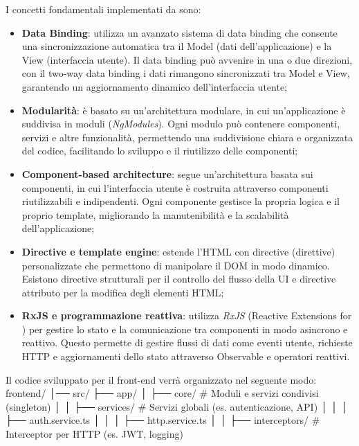 I concetti fondamentali implementati da  sono:
\begin{itemize}
    \item \textbf{Data Binding}:  utilizza un avanzato sistema di data binding che consente una sincronizzazione automatica tra il Model (dati dell'applicazione) e la View (interfaccia utente).
    Il data binding può avvenire in una o due direzioni, con il two-way data binding i dati rimangono sincronizzati tra Model e View, garantendo un aggiornamento dinamico dell'interfaccia utente;
    \item \textbf{Modularità}:   è basato su un'architettura modulare, in cui un'applicazione è suddivisa in moduli (\textit{NgModules}).
    Ogni modulo può contenere componenti, servizi e altre funzionalità, permettendo una suddivisione chiara e organizzata del codice, facilitando lo sviluppo e il riutilizzo delle componenti;
    \item \textbf{Component-based architecture}:   segue un'architettura basata sui componenti, in cui l'interfaccia utente è costruita attraverso componenti riutilizzabili e indipendenti.
    Ogni componente gestisce la propria logica e il proprio template, migliorando la manutenibilità e la scalabilità dell'applicazione;
    \item \textbf{Directive e template engine}:  estende l'HTML con directive (direttive) personalizzate che permettono di manipolare il DOM in modo dinamico.
    Esistono directive strutturali per il controllo del flusso della UI e directive attributo per la modifica degli elementi HTML;
    \item \textbf{RxJS e programmazione reattiva}:  utilizza \textit{RxJS} (Reactive Extensions for ) per gestire lo stato e la comunicazione tra componenti in modo asincrono e reattivo.
    Questo permette di gestire flussi di dati come eventi utente, richieste HTTP e aggiornamenti dello stato attraverso Observable e operatori reattivi.
\end{itemize}
Il codice sviluppato per il front-end verrà organizzato nel seguente modo:
\iffalse
    frontend/
    │── src/
        ├── app/
        │   ├── core/                     # Moduli e servizi condivisi (singleton)
        │   │   ├── services/             # Servizi globali (es. autenticazione, API)
        │   │   │   ├── auth.service.ts
        │   │   │   ├── http.service.ts
        │   │   ├── interceptors/         # Interceptor per HTTP (es. JWT, logging)

